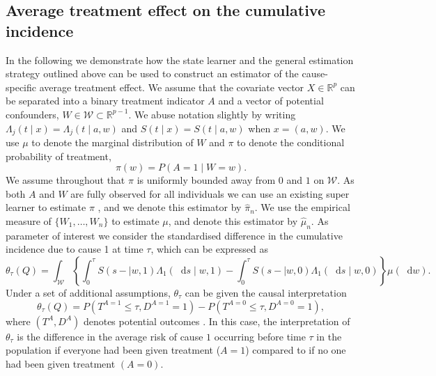 \documentclass{statsoc}
\newcommand{\R}{\mathbb{R}}
\newcommand*\diff{\mathop{}\!\mathrm{d}}
\newcommand{\1}{\mathds{1}}
\begin{document}
\subsection{Average treatment effect on the cumulative incidence}
\label{sec:cause-spec-aver}

In the following we demonstrate how the state learner and the general estimation
strategy outlined above can be used to construct an estimator of the
cause-specific average treatment effect. We assume that the covariate vector
\( X \in \R^p \) can be separated into a binary treatment indicator \( A \) and
a vector of potential confounders, \( W \in \mathcal{W}\subset \R^{p-1} \). We
abuse notation slightly by writing
\( \Lambda_j(t \mid x) = \Lambda_j(t \mid a, w) \) and
\( S(t \mid x) = S(t \mid a, w) \) when \( x=(a, w) \). We use $\mu$ to denote
the marginal distribution of \( W \) and $\pi$ to denote the conditional
probability of treatment,
\begin{equation*}
  \pi(w) = P(A=1 \mid W=w).
\end{equation*}
We assume throughout that $\pi$ is uniformly bounded away from \( 0 \) and
\( 1 \) on \( \mathcal{W} \). As both \( A \) and \( W \) are fully observed for
all individuals we can use an existing super learner to estimate $\pi$
\citep{Polley_Ledell_Kennedy_Laan_2023_Superlearn}, and we denote this estimator
by $\hat{\pi}_n$. We use the empirical measure of \( \{W_1, \dots, W_n\} \) to
estimate $\mu$, and denote this estimator by $\hat{\mu}_n$. As parameter of
interest we consider the standardised difference in the cumulative incidence due
to cause 1 at time $\tau$, which can be expressed as
\begin{equation*}
  \theta_{{\tau}}(Q) = \int_{\mathcal{W}} 
  \left\{
    \int_0^{\tau}
    S(s- \mid w, 1)  \Lambda_1(\diff s \mid w, 1)
    -
    \int_0^{\tau}
    S(s- \mid w, 0)  \Lambda_1(\diff s \mid w, 0)
  \right\}
  \mu(\diff w).
\end{equation*}
Under a set of
additional assumptions, \( \theta_{{\tau}} \) can be given the causal
interpretation
\begin{equation*}
  \theta_{{\tau}}(Q) =
  P{(T^{A=1} \leq \tau, D^{A=1}=1)}-
  P{(T^{A=0} \leq \tau, D^{A=0}=1)},
\end{equation*}
where \( (T^A, D^A) \) denotes potential outcomes \citep{hernanRobinsWhatIf}. In
this case, the interpretation of $\theta_{\tau}$ is the difference in the
average risk of cause \( 1 \) occurring before time \( \tau \) in the population
if everyone had been given treatment (\( A=1 \)) compared to if no one had been
given treatment \( (A=0) \).
\end{document}
